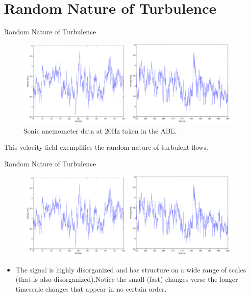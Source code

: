 \section{Random Nature of Turbulence} %

\begin{frame}{Random Nature of Turbulence}
  \begin{figure}[H]
  \centering
  \includegraphics[width=1\textwidth]{timetrace1.png}
  \caption{\scriptsize Sonic anemometer data at 20Hz taken in the ABL.}
  \end{figure}
  
  This velocity field exemplifies the random nature of turbulent flows.
\end{frame}


\begin{frame}{Random Nature of Turbulence}
  \begin{figure}[H]
  \centering
  \includegraphics[width=1\textwidth]{timetrace1.png}
  \end{figure}
  \begin{itemize}
  \item The signal is highly disorganized and has structure on a wide range of scales (that is also disorganized).\newline\newline Notice the small (fast) changes verse the longer timescale changes that appear in no certain order.
  \end{itemize}
\end{frame}

